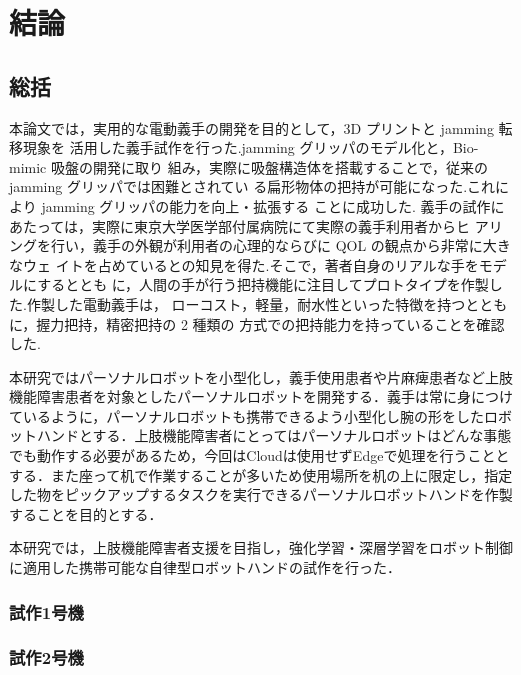 \chapter{結論}
\newpage

\section{総括}

本論文では，実用的な電動義手の開発を目的として，3D プリントと jamming 転移現象を 活用した義手試作を行った.jamming グリッパのモデル化と，Bio-mimic 吸盤の開発に取り 組み，実際に吸盤構造体を搭載することで，従来の jamming グリッパでは困難とされてい る扁形物体の把持が可能になった.これにより jamming グリッパの能力を向上・拡張する ことに成功した.
義手の試作にあたっては，実際に東京大学医学部付属病院にて実際の義手利用者からヒ アリングを行い，義手の外観が利用者の心理的ならびに QOL の観点から非常に大きなウェ イトを占めているとの知見を得た.そこで，著者自身のリアルな手をモデルにするととも に，人間の手が行う把持機能に注目してプロトタイプを作製した.作製した電動義手は， ローコスト，軽量，耐水性といった特徴を持つとともに，握力把持，精密把持の 2 種類の 方式での把持能力を持っていることを確認した.

本研究ではパーソナルロボットを小型化し，義手使用患者や片麻痺患者など上肢機能障害患者を対象としたパーソナルロボットを開発する．義手は常に身につけているように，パーソナルロボットも携帯できるよう小型化し腕の形をしたロボットハンドとする．上肢機能障害者にとってはパーソナルロボットはどんな事態でも動作する必要があるため，今回はCloudは使用せずEdgeで処理を行うこととする．また座って机で作業することが多いため使用場所を机の上に限定し，指定した物をピックアップするタスクを実行できるパーソナルロボットハンドを作製することを目的とする．





本研究では，上肢機能障害者支援を目指し，強化学習・深層学習をロボット制御に適用した携帯可能な自律型ロボットハンドの試作を行った．

\subsection*{試作1号機}



\subsection*{試作2号機}



